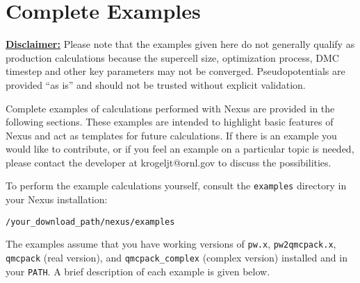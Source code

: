 \documentclass[oneside,11pt]{memoir}
\numberwithin{equation}{section}
\newcommand{\bu}[1]{\textbf{\underline{#1}}}
\begin{document}
\pagebreak
\chapter{Complete Examples} \label{sec:examples}

\bu{Disclaimer:} Please note that the examples given here do not generally qualify as production 
calculations because the supercell size, optimization process, DMC timestep and 
other key parameters may not be converged.  Pseudopotentials are provided 
``as is'' and should not be trusted without explicit validation.

Complete examples of calculations performed with Nexus are provided 
in the following sections.  These examples are intended to highlight basic 
features of Nexus and act as templates for future calculations.  
If there is an example you 
would like to contribute, or if you feel an example on a particular topic is 
needed, please contact the developer at krogeljt@ornl.gov to discuss the 
possibilities.  

To perform the example calculations yourself, consult the \texttt{examples} 
directory in your Nexus installation:
\begin{shaded}
\begin{verbatim}
/your_download_path/nexus/examples
\end{verbatim}
\end{shaded}
\noindent
The examples assume that you have working versions of \texttt{pw.x}, 
\texttt{pw2qmcpack.x}, \texttt{qmcpack} (real version), and 
\texttt{qmcpack\_complex} (complex version) installed and in your \texttt{PATH}. 
A brief description of each example is given below.  
\end{document}
